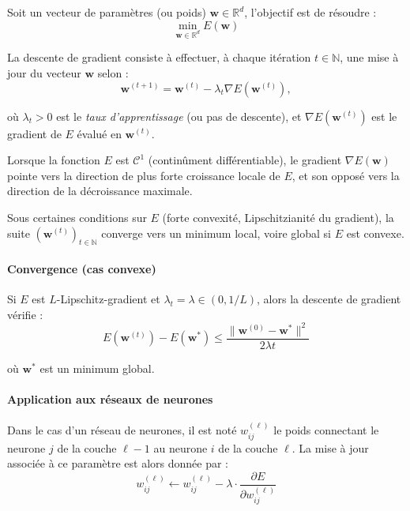 Soit un vecteur de paramètres (ou poids) \( \boldsymbol{w} \in \mathbb{R}^d \), l'objectif est de résoudre :
\begin{equation}
    \min_{\boldsymbol{w} \in \mathbb{R}^d} E(\boldsymbol{w})
\end{equation}

La descente de gradient consiste à effectuer, à chaque itération \( t \in \mathbb{N} \), une mise à jour du vecteur \( \boldsymbol{w} \) selon :
\begin{equation}
    \boldsymbol{w}^{(t+1)} = \boldsymbol{w}^{(t)} - \lambda_t \nabla E(\boldsymbol{w}^{(t)}),
\end{equation}

où \( \lambda_t > 0 \) est le \textit{taux d’apprentissage} (ou pas de descente), et \( \nabla E(\boldsymbol{w}^{(t)}) \) est le gradient de \( E \) évalué en \( \boldsymbol{w}^{(t)} \).

Lorsque la fonction \( E \) est \( \mathcal{C}^1 \) (continûment différentiable), le gradient \( \nabla E(\boldsymbol{w}) \) pointe vers la direction de plus forte croissance locale de \( E \), et son opposé vers la direction de la décroissance maximale. 

Sous certaines conditions sur \( E \) (forte convexité, Lipschitzianité du gradient), la suite \( (\boldsymbol{w}^{(t)})_{t \in \mathbb{N}} \) converge vers un minimum local, voire global si \( E \) est convexe.

\paragraph{Convergence (cas convexe)} Si \( E \) est \( L \)-Lipschitz-gradient et \( \lambda_t = \lambda \in (0, 1/L) \), alors la descente de gradient vérifie :
\begin{equation}
    E(\boldsymbol{w}^{(t)}) - E(\boldsymbol{w}^*) \leq \frac{\| \boldsymbol{w}^{(0)} - \boldsymbol{w}^* \|^2}{2\lambda t}
\end{equation}

où \( \boldsymbol{w}^* \) est un minimum global.

\paragraph{Application aux réseaux de neurones} 
Dans le cas d’un réseau de neurones, il est noté \( w_{ij}^{(\ell)} \) le poids connectant le neurone \( j \) de la couche \( \ell-1 \) au neurone \( i \) de la couche \( \ell \). La mise à jour associée à ce paramètre est alors donnée par :
\begin{equation}
    w_{ij}^{(\ell)} \leftarrow w_{ij}^{(\ell)} - \lambda \cdot \frac{\partial E}{\partial w_{ij}^{(\ell)}}
\end{equation}

